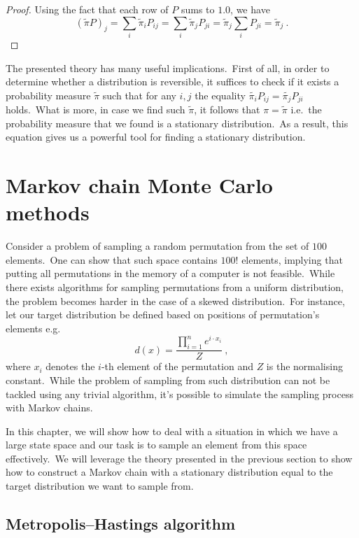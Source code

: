 \documentclass[shortabstract, english, lic]{iithesis}
\newcommand\numberedchapter[1]{\setlength\topskip{3cm}\chapter{#1}\setlength\topskip{0cm}}
\theoremstyle{default_theorem_style}\newtheorem{theorem}{Theorem}
\theoremstyle{default_theorem_style}\newtheorem{definition}{Definition}
\begin{document}
\begin{proof}
Using the fact that each row of $P$ sums to $1.0$, we have
$$
(\tilde{\pi} P)_j = \sum\limits_i \tilde{\pi}_i P_{ij} = \sum\limits_i \tilde{\pi}_j P_{ji} =
\tilde{\pi}_j \sum\limits_i P_{ji} = \tilde{\pi}_j\ .
$$
\end{proof}

\noindent The presented theory has many useful implications.\ First of all, in order to determine
whether a distribution is reversible, it suffices to check if it exists a probability measure $\tilde{\pi}$ such that
for any $i, j$ the equality $\tilde{\pi_i} P_{ij} = \tilde{\pi_j} P_{ji}$ holds.\ What is more, in case we find such
$\tilde{\pi}$, it follows that $\pi = \tilde{\pi}$ i.e.\ the probability measure that we found is a stationary
distribution.\ As a result, this equation gives us a powerful tool for finding a stationary distribution.

\numberedchapter{Markov chain Monte Carlo methods}\label{chapter:mcmc}

Consider a problem of sampling a random permutation from the set of $100$ elements.\ One can show that such space
contains $100!$ elements, implying that putting all permutations in the memory of a computer is not feasible.\ While
there exists algorithms for sampling permutations from a uniform distribution, the problem becomes harder in the case of
a skewed distribution.\ For instance, let our target distribution be defined based on positions of permutation's
elements e.g.
$$
d(x) = \frac{\prod_{i = 1}^{n} e^{i \cdot x_i}}{Z}\ ,
$$
where $x_i$ denotes the $i$-th element of the permutation and $Z$ is the normalising constant.\ While the problem
of sampling from such distribution can not be tackled using any trivial algorithm, it's possible to simulate the
sampling process with Markov chains.\newline

\noindent In this chapter, we will show how to deal with a situation in which we have a large state space and our
task is to sample an element from this space effectively.\ We will leverage the theory presented in the previous
section to show how to construct a Markov chain with a stationary distribution equal to the target distribution we
want to sample from.

\section{Metropolis–Hastings algorithm}
\end{document}
